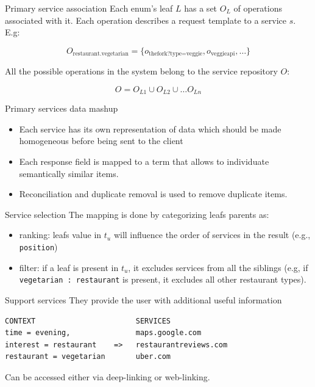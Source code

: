 \documentclass[smaller]{beamer}
\begin{document}
\begin{frame}[label={sec:orgheadline12}]{Primary service association}
Each enum's leaf \(L\) has a set \(O_L\) of operations associated with it. Each 
operation describes a request template to a service \(s\). E.g:

\begin{equation}
O_{\textrm{restaurant.vegetarian}}= \{ o_{\textrm{thefork?type=veggie}}, o_{\textrm{veggieapi}}, \ldots \}
\end{equation}

All the possible operations in the system belong to the service repository \(O\):

\begin{equation}
O = O_{L1} \cup O_{L2} \cup \ldots O_{Ln}
\end{equation}
\end{frame}

\begin{frame}[label={sec:orgheadline13}]{Primary services data mashup}
\begin{itemize}
\item Each service has its own representation of data which should be made
homogeneous before being sent to the client

\item Each response field is mapped to a \alert{term} that allows to individuate
semantically similar items.

\item Reconciliation and duplicate removal is used to remove duplicate items.
\end{itemize}
\end{frame}

\begin{frame}[fragile,label={sec:orgheadline14}]{Service selection}
 The mapping is done by categorizing leafs parents as:

\begin{itemize}
\item \alert{ranking}: leafs value in \(t_u\) will influence the order of services in the result (e.g., \texttt{position})

\item \alert{filter}: if a leaf is present in \(t_u\), it excludes services from all the siblings (e.g, if
\texttt{vegetarian : restaurant} is present, it excludes all other restaurant types).
\end{itemize}
\end{frame}

\begin{frame}[fragile,label={sec:orgheadline15}]{Support services}
 They provide the user with \alert{additional useful information}

\begin{verbatim}
CONTEXT                       SERVICES
time = evening,               maps.google.com 
interest = restaurant    =>   restaurantreviews.com
restaurant = vegetarian       uber.com
\end{verbatim}

Can be accessed either via \alert{deep-linking} or \alert{web-linking}.
\end{frame}
\end{document}
